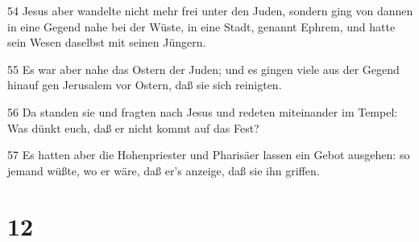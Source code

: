 \par 54 Jesus aber wandelte nicht mehr frei unter den Juden, sondern ging von dannen in eine Gegend nahe bei der Wüste, in eine Stadt, genannt Ephrem, und hatte sein Wesen daselbst mit seinen Jüngern.
\par 55 Es war aber nahe das Ostern der Juden; und es gingen viele aus der Gegend hinauf gen Jerusalem vor Ostern, daß sie sich reinigten.
\par 56 Da standen sie und fragten nach Jesus und redeten miteinander im Tempel: Was dünkt euch, daß er nicht kommt auf das Fest?
\par 57 Es hatten aber die Hohenpriester und Pharisäer lassen ein Gebot ausgehen: so jemand wüßte, wo er wäre, daß er's anzeige, daß sie ihn griffen.

\chapter{12}

